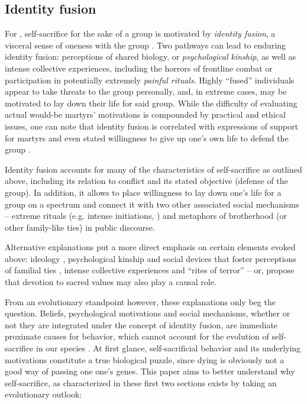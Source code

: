 \documentclass[a4paper,12pt]{report}
\begin{document}
\subsection{Identity fusion}
For , self-sacrifice for the sake of a group is motivated by
\emph{identity fusion}, a visceral sense of oneness with the group \cite{swann_when_2012}.
Two pathways can lead to enduring identity fusion: perceptions of shared biology, 
or \emph{psychological kinship}, as well as intense collective experiences,
including the horrors of frontline combat or participation in potentially extremely 
\emph{painful rituals}. Highly “fused” individuals appear to take threats
to the group personally, and, in extreme cases, may be motivated to lay down their life
for said group. While the difficulty of evaluating actual would-be martyrs’ motivations
is compounded by practical and ethical issues, one can note that identity fusion is 
correlated with expressions of support for martyrs and even stated willingness to give up one’s 
own life to defend the group \cite{whitehouse_dying_2018}.

Identity fusion accounts for many of the characteristics of self-sacrifice as outlined above,
including its relation to conflict and its stated objective (defense of the group).
In addition, it allows to place willingness to lay down one’s life for a group on a
spectrum and connect it with two other associated social mechanisms – extreme rituals
(e.g. intense initiations, ) and metaphors of brotherhood
(or other family-like ties) in public discourse.

Alternative explanations put a more direct emphasis on certain elements evoked above:
ideology \cite{pape_dying_2006}, psychological kinship and social devices that foster perceptions of
familial ties \cite{swann_what_2014}, intense collective experiences and “rites of terror”
\cite{whitehouse_rites_1996} – or, propose that devotion to sacred values \cite{atran_talking_2011} may
also play a causal role.


From an evolutionary standpoint however, these explanations only beg the question.
Beliefs, psychological motivations and social mechanisms, whether or not they are
integrated under the concept of identity fusion, are immediate proximate causes for behavior,
which cannot account for the evolution of self-sacrifice in our species \cite{tinbergen_aims_2010}.
At first glance, self-sacrificial behavior and its underlying motivations constitute
a true biological puzzle, since dying is obviously not a good way of passing one one’s genes.
This paper aims to better understand why self-sacrifice, as characterized in these first
two sections exists by taking an evolutionary outlook:
\end{document}
